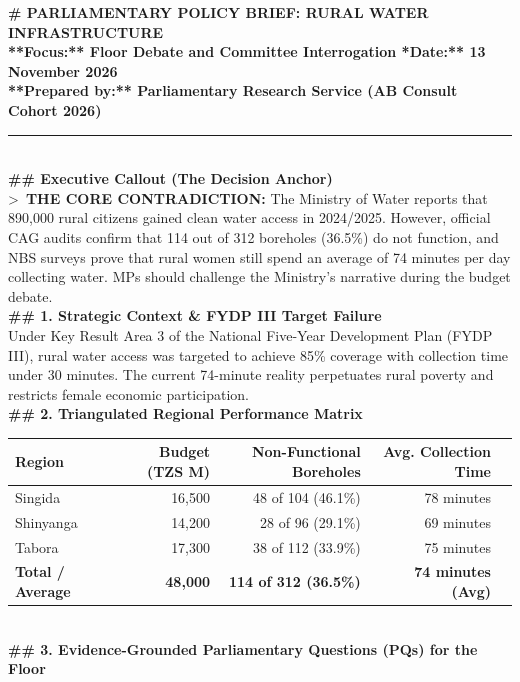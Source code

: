 \documentclass[11pt, a4paper]{report}
\begin{document}
\begin{tcolorbox}[colback=lightgrey, colframe=bordergrey, title=\textbf{Deliverable 5B Preview: \texttt{Report2\_Policy\_Brief\_Water\_Oversight.md}}]
\small
\textbf{\# PARLIAMENTARY POLICY BRIEF: RURAL WATER INFRASTRUCTURE}\\
\textbf{**Focus:** Floor Debate and Committee Interrogation \quad \textbar{} \quad **Date:** 13 November 2026}\\
\textbf{**Prepared by:** Parliamentary Research Service (AB Consult Cohort 2026)}\\[0.2cm]
\rule{\textwidth}{0.4pt}\\[0.2cm]
\textbf{\#\# Executive Callout (The Decision Anchor)}\\
\textgreater\ \textbf{THE CORE CONTRADICTION:} The Ministry of Water reports that 890,000 rural citizens gained clean water access in 2024/2025. However, official CAG audits confirm that 114 out of 312 boreholes (36.5\%) do not function, and NBS surveys prove that rural women still spend an average of 74 minutes per day collecting water. MPs should challenge the Ministry's narrative during the budget debate.\\[0.2cm]
\textbf{\#\# 1. Strategic Context \& FYDP III Target Failure}\\
Under Key Result Area 3 of the National Five-Year Development Plan (FYDP III), rural water access was targeted to achieve 85\% coverage with collection time under 30 minutes. The current 74-minute reality perpetuates rural poverty and restricts female economic participation.\\[0.2cm]
\textbf{\#\# 2. Triangulated Regional Performance Matrix}\\
\begin{tabular}{lrrrr}
\toprule
\textbf{Region} & \textbf{Budget (TZS M)} & \textbf{Non-Functional Boreholes} & \textbf{Avg. Collection Time} \\
\midrule
Singida & 16,500 & 48 of 104 (46.1\%) & 78 minutes \\
Shinyanga & 14,200 & 28 of 96 (29.1\%) & 69 minutes \\
Tabora & 17,300 & 38 of 112 (33.9\%) & 75 minutes \\
\midrule
\textbf{Total / Average} & \textbf{48,000} & \textbf{114 of 312 (36.5\%)} & \textbf{74 minutes (Avg)} \\
\bottomrule
\end{tabular}\\[0.2cm]
\textbf{\#\# 3. Evidence-Grounded Parliamentary Questions (PQs) for the Floor}\\

\end{tcolorbox}
\end{document}
